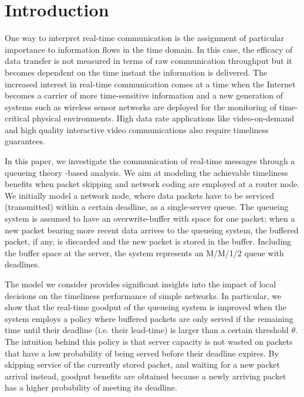 \documentclass[preprint,12pt]{elsarticle}
\theoremstyle{definition}
\theoremstyle{plain}
\theoremstyle{remark}
\begin{document}
\section{Introduction}
One way to interpret real-time communication is the assignment of particular importance to information flows in the time domain. In this case, the efficacy of data transfer is not measured in terms of raw communication throughput but it becomes dependent on the time instant the information is delivered. The increased interest in real-time communication comes at a time when the Internet becomes a carrier of more time-sensitive information and a new generation of systems such as wireless sensor networks are deployed for the monitoring of time-critical physical environments. High data rate applications like video-on-demand and high quality interactive video communications also require timeliness guarantees.

In this paper, we investigate the communication of real-time messages through a queueing theory -based analysis. We aim at modeling the achievable timeliness benefits when packet skipping and network coding are employed at a router node. We initially model a network node, where data packets have to be serviced (transmitted) within a certain deadline, as a single-server queue. The queueing system is assumed to have an overwrite-buffer with space for one packet; when a new packet bearing more recent data arrives to the queueing system, the buffered packet, if any, is discarded and the new packet is stored in the buffer. Including the buffer space at the server, the system represents an M/M/1/2 queue with deadlines.

The model we consider provides significant insights into the impact of local decisions on the timeliness performance of simple networks. In particular, we show that the real-time goodput of the queueing system is improved when the system employs a policy where buffered packets are only served if the remaining time until their deadline (i.e. their lead-time) is larger than a certain threshold $\theta$. The intuition behind this policy is that server capacity is not wasted on packets that have a low probability of being served before their deadline expires. By skipping service of the currently stored packet, and waiting for a new packet arrival instead, goodput benefits are obtained because a newly arriving packet has a higher probability of meeting its deadline.
\end{document}
